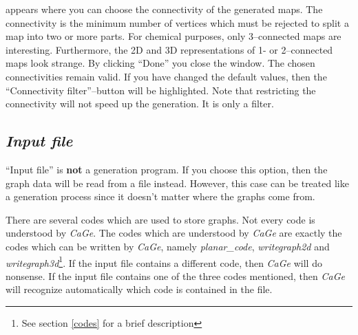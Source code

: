 \documentclass[a4paper]{article}
\def\CaGe{\textit{CaGe}}
\begin{document}
\begin{description}
appears where you can choose the connectivity of the generated maps. The
connectivity is the minimum number of vertices which must be rejected to split
a map into two or more parts. For chemical purposes, only 3--connected maps
are interesting. Furthermore, the 2D and 3D representations of 1- or 
2--connected maps look strange. By clicking ``Done'' you close the window.
The chosen connectivities remain valid. If you have changed the default values,
then the ``Connectivity filter''--button will be highlighted. Note that
restricting the connectivity will not speed up the generation. It is only a
filter.
\end{description}

\subsection{\textit{Input file}}
``Input file'' is \textbf{not} a generation program. If you choose this option,
then the graph data will be read from a file instead. However, this case can 
be treated like a generation process since it doesn't matter where the graphs
come from.

There are several codes which are used to store graphs. Not every code is
understood by \CaGe{}. The codes which are understood by \CaGe{} are exactly
the codes which can be written by \CaGe{}, namely \textit{planar\_code},
\textit{writegraph2d} and \textit{writegraph3d}\footnote{See section
\ref{codes} for a brief description}. If the input file contains a different
code, then \CaGe{} will do nonsense. If the input file contains one of the
three codes mentioned, then \CaGe{} will recognize automatically which code
is contained in the file.
\end{document}
